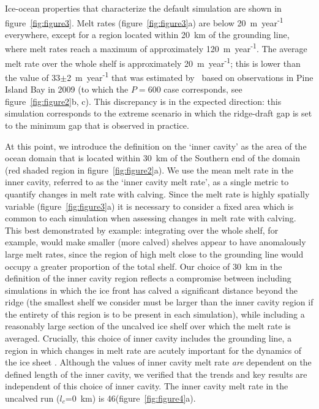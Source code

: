 \documentclass[draft]{agujournal2019}
\begin{document}
Ice-ocean properties that characterize the default simulation are shown in figure~\ref{fig:figure3}. Melt rates (figure~\ref{fig:figure3}a) are below  20~m~year\textsuperscript{-1} everywhere, except for a region located within 20~km of the grounding line, where melt rates reach a maximum of approximately 120~m~year\textsuperscript{-1}. The average melt rate over the whole shelf is approximately 20~m~year\textsuperscript{-1}; this is lower than the value of 33$\pm$2~m~year\textsuperscript{-1} that was estimated by~ based on observations in Pine Island Bay in 2009 (to which the $P=600$ case corresponds, see figure~\ref{fig:figure2}b, c). This discrepancy is in the expected direction: this simulation corresponds to the extreme scenario in which the ridge-draft gap is set to the minimum gap that is observed in practice.

At this point, we introduce the definition on the `inner cavity' as the area of the ocean domain that is located within 30~km of the Southern end of the domain (red shaded region in figure~\ref{fig:figure2}a). We use the mean melt rate in the inner cavity, referred to as the `inner cavity melt rate', as a single metric to quantify changes in melt rate with calving. Since the melt rate is highly spatially variable (figure~\ref{fig:figure3}a) it is necessary to consider a fixed area which is common to each simulation when assessing changes in melt rate with calving. This best demonstrated by example: integrating over the whole shelf, for example, would make smaller (more calved) shelves appear to have anomalously large melt rates, since the region of high melt close to the grounding line would occupy a greater proportion of the total shelf. %
Our choice of 30~km in the definition of the inner cavity region reflects a compromise between including simulations in which the ice front has calved a significant distance beyond the ridge (the smallest shelf we consider must be larger than the inner cavity region if the entirety of this region is to be present in each simulation), while including a reasonably large section of the uncalved ice shelf over which the melt rate is averaged. Crucially, this choice of inner cavity includes the grounding line, a region in which changes in melt rate are acutely important for the dynamics of the ice sheet \cite{Seroussi2014Cryo, Athern2017GRL}. Although the values of inner cavity melt rate \textit{are} dependent on the defined length of the inner cavity, we verified that the trends and key results are independent of this choice of inner cavity. The inner cavity melt rate in the uncalved run ($l_c$=0~km) is 46\mpryr (figure~\ref{fig:figure4}a).
\end{document}
